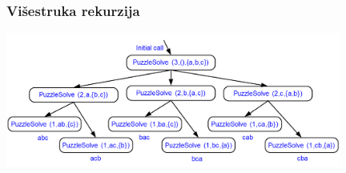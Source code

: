 \documentclass[compress,aspectratio=169]{beamer}
\begin{document}
\begin{frame}[fragile]
  \frametitle{Višestruka rekurzija}
  \begin{center}
    \includegraphics[width=11cm]{asp-02-pic09.png}
  \end{center}
\end{frame}
\end{document}
